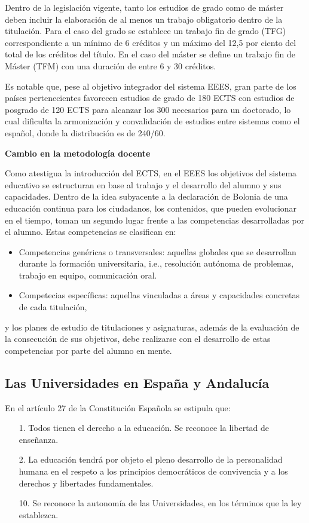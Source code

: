 \documentclass[a4paper,12pt,twoside]{article}
\begin{document}
Dentro de la legislación vigente, tanto los estudios de grado como de máster deben incluir la elaboración de al menos un trabajo obligatorio dentro de la titulación. Para el caso del grado se establece un trabajo fin de grado (TFG) correspondiente a un mínimo de
6 créditos y un máximo del 12,5 por ciento del total de los créditos del título. En el caso
del máster se define un trabajo fin de Máster (TFM) con una duración de entre 6
y 30 créditos.

Es notable que, pese al objetivo integrador del sistema EEES, gran parte de los países pertenecientes favorecen estudios de grado de 180 ECTS con estudios de posgrado de 120 ECTS para alcanzar los 300 necesarios para un doctorado, lo cual dificulta la armonización y convalidación de estudios entre sistemas como el español, donde la distribución es de 240/60.

\textbf{Cambio en la metodología docente}

Como atestigua la introducción del ECTS, en el EEES los objetivos del sistema educativo se estructuran en base al trabajo y el desarrollo del alumno y sus capacidades. Dentro de la idea subyacente a la declaración de Bolonia de una educación continua para los ciudadanos, los contenidos, que pueden evolucionar en el tiempo, toman un segundo lugar frente a las competencias desarrolladas por el alumno. Estas competencias se clasifican en:

\begin{itemize}
\item Competencias genéricas o transversales: aquellas globales que se desarrollan durante la formación universitaria, i.e., resolución autónoma de problemas, trabajo en equipo, comunicación oral.
\item Competecias específicas: aquellas vinculadas a áreas y capacidades
concretas de cada titulación,
\end{itemize} 

y los planes de estudio de titulaciones y asignaturas, además de la evaluación de la consecución de sus objetivos, debe realizarse con el desarrollo de estas competencias por parte del alumno en mente.

\subsection{Las Universidades en España y Andalucía}

En el artículo 27 de la Constitución Española se estipula que:

\begin{enumerate}
\item[1.] Todos tienen el derecho a la educación. Se reconoce la libertad de enseñanza.
\item[2.] La educación tendrá por objeto el pleno desarrollo de la personalidad humana en el respeto a los principios democráticos de convivencia y a los derechos y libertades fundamentales.
\item[10.] Se reconoce la autonomía de las Universidades, en los términos que la ley establezca.
\end{enumerate}
\end{document}
